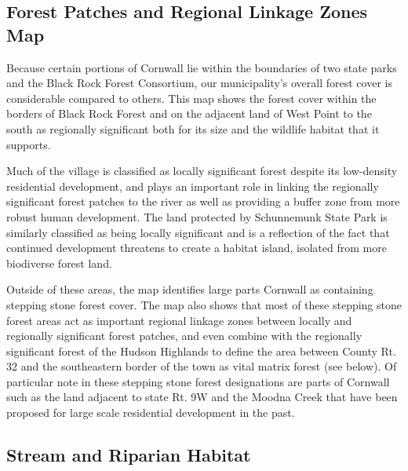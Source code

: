 \subsection*{Forest Patches and Regional Linkage Zones Map}
\label{subsec:forestpatchesandreglinkagezonesmap}
Because certain portions of Cornwall lie within the boundaries of two state
parks and the Black Rock Forest Consortium, our municipality’s overall forest
cover is considerable compared to others. This map shows the forest cover
within the borders of Black Rock Forest and on the adjacent land of West Point
to the south as regionally significant both for its size and the wildlife
habitat that it supports.
\par
Much of the village is classified as locally significant forest despite its
low-density residential development, and plays an important role in linking the
regionally significant forest patches to the river as well as providing a
buffer zone from more robust human development. The land protected by
Schunnemunk State Park is similarly classified as being locally significant and
is a reflection of the fact that continued development threatens to create a
habitat island, isolated from more biodiverse forest land.
\par
Outside of these areas, the map identifies large parts Cornwall as containing
stepping stone forest cover. The map also shows that most of these stepping
stone forest areas act as important regional linkage zones between locally and
regionally significant forest patches, and even combine with the regionally
significant forest of the Hudson Highlands to define the area between County
Rt. 32 and the southeastern border of the town as vital matrix forest (see
below). Of particular note in these stepping stone forest designations are
parts of Cornwall such as the land adjacent to state Rt. 9W and the Moodna
Creek that have been proposed for large scale residential development in the
past.

\label{map:forestpatches}

\subsection{Stream and Riparian Habitat}\label{subsec:streamandriparianhabitat}
